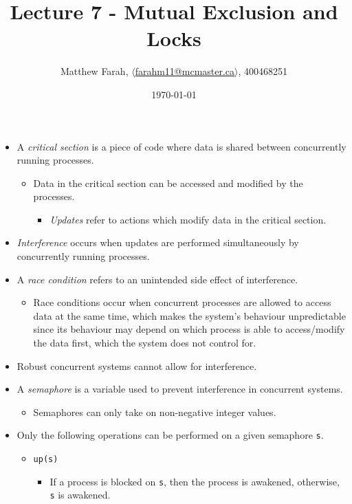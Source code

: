 \documentclass{article}
\title{Lecture 7 - Mutual Exclusion and Locks}
\author{Matthew Farah, \href{mailto:farahm11@mcmaster.ca}{$\langle$farahm11@mcmaster.ca$\rangle$}, 400468251}
\date{\today}
\begin{document}
\maketitle
\pagestyle{fancy}

\fi

\begin{itemize}
	\item A \emph{critical section} is a piece of code where data is shared between concurrently running processes.
	\begin{itemize}
		\item Data in the critical section can be accessed and modified by the processes.
		\begin{itemize}
			\item \emph{Updates} refer to actions which modify data in the critical section.
		\end{itemize}
	\end{itemize}
	\item \emph{Interference} occurs when updates are performed simultaneously by concurrently running processes.
	\item A \emph{race condition} refers to an unintended side effect of interference.
	\begin{itemize}
		\item Race conditions occur when concurrent processes are allowed to access data at the same time, which makes the system's behaviour unpredictable since its behaviour may depend on which process is able to access/modify the data first, which the system does not control for.
	\end{itemize}
	\item Robust concurrent systems cannot allow for interference.
	\item A \emph{semaphore} is a variable used to prevent interference in concurrent systems.
	\begin{itemize}
		\item Semaphores can only take on non-negative integer values.
	\end{itemize}
	\item Only the following operations can be performed on a given semaphore \texttt{s}.
	\begin{itemize}
		\item \texttt{up(s)}
		\begin{itemize}
			\item If a process is blocked on \texttt{s}, then the process is awakened, otherwise, \texttt{s} is awakened.

\end{itemize}
\end{itemize}
\end{itemize}
\end{document}
